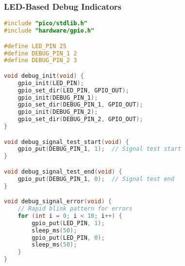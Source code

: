 \documentclass{beamer}
\begin{document}
\begin{frame}[fragile]
\frametitle{LED-Based Debug Indicators}
\begin{lstlisting}[language=C]
#include "pico/stdlib.h"
#include "hardware/gpio.h"

#define LED_PIN 25
#define DEBUG_PIN_1 2
#define DEBUG_PIN_2 3

void debug_init(void) {
    gpio_init(LED_PIN);
    gpio_set_dir(LED_PIN, GPIO_OUT);
    gpio_init(DEBUG_PIN_1);
    gpio_set_dir(DEBUG_PIN_1, GPIO_OUT);
    gpio_init(DEBUG_PIN_2);
    gpio_set_dir(DEBUG_PIN_2, GPIO_OUT);
}

void debug_signal_test_start(void) {
    gpio_put(DEBUG_PIN_1, 1);  // Signal test start
}

void debug_signal_test_end(void) {
    gpio_put(DEBUG_PIN_1, 0);  // Signal test end
}

void debug_signal_error(void) {
    // Rapid blink pattern for errors
    for (int i = 0; i < 10; i++) {
        gpio_put(LED_PIN, 1);
        sleep_ms(50);
        gpio_put(LED_PIN, 0);
        sleep_ms(50);
    }
}
\end{lstlisting}
\end{frame}
\end{document}
